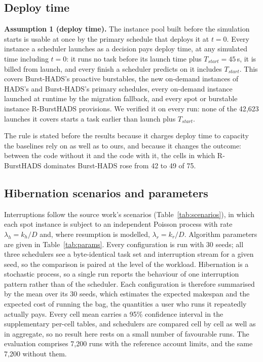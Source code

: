 \documentclass[conference]{IEEEtran}
\begin{document}
\subsection{Deploy time}

\noindent\textbf{Assumption 1 (deploy time).} The instance pool built before
the simulation starts is usable at once by the primary schedule that deploys it
at $t = 0$. Every instance a scheduler launches as a decision pays deploy time,
at any simulated time including $t = 0$: it runs no task before its launch time
plus $T_{\mathit{start}} = 45$\,s, it is billed from launch, and every finish a
scheduler predicts on it includes $T_{\mathit{start}}$. This covers
Burst-HADS's proactive burstables, the new on-demand instances of HADS's and
Burst-HADS's primary schedules, every on-demand instance launched at runtime by
the migration fallback, and every spot or burstable instance R-BurstHADS
provisions. We verified it on every run: none of the 42{,}623 launches it
covers starts a task earlier than launch plus $T_{\mathit{start}}$.

The rule is stated before the results because it charges deploy time to
capacity the baselines rely on as well as to ours, and because it changes the
outcome: between the code without it and the code with it, the cells in which
R-BurstHADS dominates Burst-HADS rose from 42 to 49 of 75.

\subsection{Hibernation scenarios and parameters}

Interruptions follow the source work's scenarios
(Table~\ref{tab:scenarios}), in which each spot instance is subject to an
independent Poisson process with rate $\lambda_h = k_h/D$ and, where resumption
is modelled, $\lambda_r = k_r/D$. Algorithm parameters are given in
Table~\ref{tab:params}. Every configuration is run with 30 seeds; all three
schedulers see a byte-identical task set and interruption stream for a given
seed, so the comparison is paired at the level of the workload. Hibernation is a stochastic process, so a single run reports the
behaviour of one interruption pattern rather than of the scheduler. Each
configuration is therefore summarised by the mean over its 30 seeds, which
estimates the expected makespan and the expected cost of running the bag, the
quantities a user who runs it repeatedly actually pays. Every cell mean carries a
95\% confidence interval in the supplementary per-cell tables, and schedulers
are compared cell by cell as well as in aggregate, so no result here rests on a
small number of favourable runs. The
evaluation comprises 7{,}200 runs with the reference account limits, and the
same 7{,}200 without them.
\end{document}
